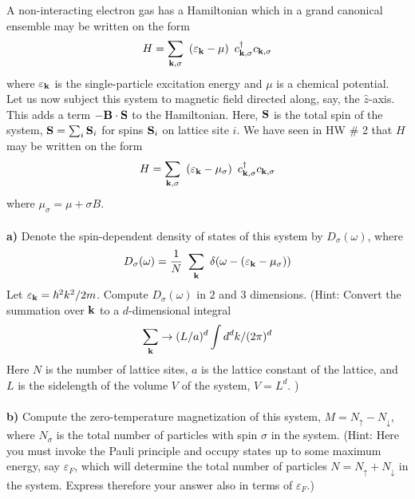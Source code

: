 \begin{problem}
	
A non-interacting electron gas has a Hamiltonian which in a grand canonical ensemble may be written on the form
\begin{eqnarray}
	H = \sum_{{\bf k},\sigma} ~ \left( \varepsilon_{{\bf k}} - \mu \right) ~ c^{\dagger}_{{\bf k}, \sigma}    c_{{\bf k}, \sigma}   \nonumber
\end{eqnarray}
where $\varepsilon_{{\bf k}}$ is the single-particle excitation energy and $\mu$ is a chemical potential. Let us now subject this system to magnetic field directed along, say, the $\hat z$-axis. This adds a term $- {\bf B}\cdot {\bf S}$ to the Hamiltonian. Here, ${\bf S}$ is the total spin of the system, ${\bf S} = \sum_i {\bf S}_i$ for spins ${\bf S}_i$ on lattice site $i$. 
We have seen in HW $\#$ 2 that  $H$ may be written on the form
\begin{eqnarray}
	H = \sum_{{\bf k},\sigma} ~ \left( \varepsilon_{{\bf k}} - \mu_\sigma \right) ~ c^{\dagger}_{{\bf k}, \sigma}    c_{{\bf k}, \sigma}   \nonumber
\end{eqnarray}
where $\mu_\sigma = \mu + \sigma B$.
\ \\
\ \\
{\bf a)} Denote the spin-dependent density of states of this system by $D_\sigma(\omega)$, where
\begin{eqnarray}
	D_\sigma(\omega) = \frac{1}{N} ~ \sum_{{\bf k}} ~\delta(\omega -( \varepsilon_{{\bf k}} - \mu_\sigma  )) \nonumber
\end{eqnarray} 
Let $\varepsilon_{{\bf k}} = \hbar^2 k^2/2m$. Compute $D_\sigma(\omega)$ in $2$ and $3$ dimensions. (Hint: Convert the summation over ${\bf k}$ to a $d$-dimensional integral 
$$ \sum_{{\bf k}} \to (L/a)^d \int d^d k/(2\pi)^d$$ 
Here $N$ is the number of lattice sites, $a$ is the lattice constant of the lattice, and $L$ is the sidelength of the volume $V$ of the system, $V=L^d$. )  
\ \\
\ \\
{\bf b)} Compute the zero-temperature magnetization of this system, $M = N_{\uparrow}- N_{\downarrow}$, where $N_\sigma$ is the total number of particles with spin $\sigma$ in the system. (Hint: Here you must invoke the Pauli principle and occupy states up to some maximum energy, say $\varepsilon_F$, which will determine the total number of particles $N=N_{\uparrow}+ N_{\downarrow}$ in the system. Express therefore your answer also in terms of $\varepsilon_F$.)
\end{problem}
